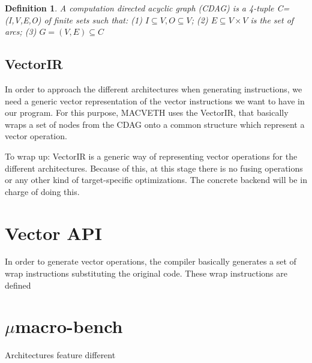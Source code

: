 \documentclass[a4paper,12pt]{memoir}
\newtheorem{definition}{Definition}[]
\begin{document}
\theoremstyle{definition}
\begin{definition}\label{def:CDAG}
	A computation directed acyclic graph (CDAG) is a 4-tuple C=(I,V,E,O) of 
	finite sets such that: (1) $I \subseteq V, O \subseteq V$; (2) $E 
	\subseteq V 
	\times V$ is the set of arcs; (3) $G=(V,E) \subseteq C$
\end{definition}


\section{VectorIR}
In order to approach the different architectures when generating instructions,
we need a generic vector representation of the vector instructions we want to
have in our program. For this purpose, MACVETH uses the VectorIR, that basically
wraps a set of nodes from the CDAG onto a common structure which represent a vector operation.

To wrap up: VectorIR is a generic way of representing vector operations for the different
architectures. Because of this, at this stage there is no fusing operations or
any other kind of target-specific optimizations. The concrete backend will be in
charge of doing this.

\chapter{Vector API}
In order to generate vector operations, the compiler basically generates a set 
of wrap instructions substituting the original code. These wrap instructions 
are defined 

\chapter{$\mu$macro-bench}
Architectures feature different 



\end{document}
